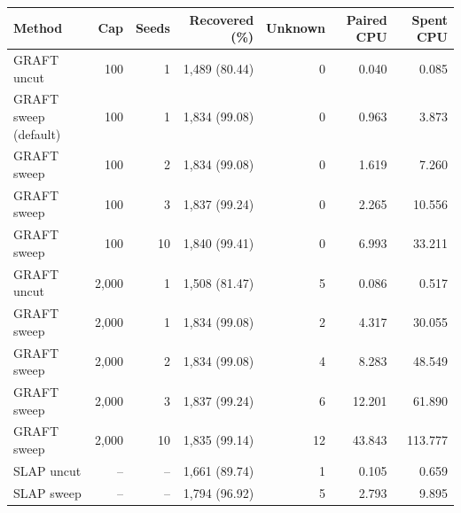 \begin{tabular}{lrrr rrr}\toprule
Method & Cap & Seeds & Recovered (\%) & Unknown & Paired CPU & Spent CPU\\\midrule
GRAFT uncut & 100 & 1 & 1,489 (80.44) & 0 & 0.040 & 0.085\\
GRAFT sweep (default) & 100 & 1 & 1,834 (99.08) & 0 & 0.963 & 3.873\\
GRAFT sweep & 100 & 2 & 1,834 (99.08) & 0 & 1.619 & 7.260\\
GRAFT sweep & 100 & 3 & 1,837 (99.24) & 0 & 2.265 & 10.556\\
GRAFT sweep & 100 & 10 & 1,840 (99.41) & 0 & 6.993 & 33.211\\
GRAFT uncut & 2,000 & 1 & 1,508 (81.47) & 5 & 0.086 & 0.517\\
GRAFT sweep & 2,000 & 1 & 1,834 (99.08) & 2 & 4.317 & 30.055\\
GRAFT sweep & 2,000 & 2 & 1,834 (99.08) & 4 & 8.283 & 48.549\\
GRAFT sweep & 2,000 & 3 & 1,837 (99.24) & 6 & 12.201 & 61.890\\
GRAFT sweep & 2,000 & 10 & 1,835 (99.14) & 12 & 43.843 & 113.777\\
SLAP uncut & -- & -- & 1,661 (89.74) & 1 & 0.105 & 0.659\\
SLAP sweep & -- & -- & 1,794 (96.92) & 5 & 2.793 & 9.895\\
\bottomrule\end{tabular}
